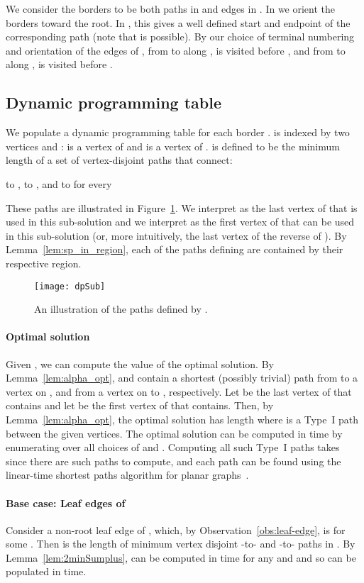 \documentclass[11pt,twoside]{article}
\begin{document}
We consider the borders to be both paths in  and edges in . In  we orient the borders toward the root.  In , this gives a well defined start  and endpoint  of the corresponding path  (note that  is possible).  By our choice of terminal numbering and orientation of the edges of , from  to  along ,  is visited before , and from  to  along ,  is visited before .

\subsection{Dynamic programming table}
We populate a dynamic programming table  for each border .   is indexed by two vertices  and :  is a vertex of   and  is a vertex of .   is defined to be the minimum length of a set of vertex-disjoint paths that connect:
  \begin{center}
     to ,  to , and  to  for every 
  \end{center}
These paths are illustrated in Figure~\ref{fig:dp-table}.
We interpret  as the last vertex of  that is used in this sub-solution and we interpret  as the first vertex of  that can be used in this sub-solution (or, more intuitively, the last vertex of the reverse of ).  By Lemma~\ref{lem:sp_in_region}, each of the paths defining  are contained by their respective region.
\begin{figure}[ht]
  \centering
    \texttt{[image: dpSub]}
  \caption{An illustration of the paths defined by .}
  \label{fig:dp-table}
\end{figure}

\paragraph{Optimal solution}  Given , we can compute the value of the optimal solution.  By Lemma~\ref{lem:alpha_opt},  and  contain a shortest (possibly trivial) path from  to a vertex  on , and from a vertex  on  to , respectively.  Let  be the last vertex of  that  contains and let  be the first vertex of  that  contains.  Then, by Lemma~\ref{lem:alpha_opt}, the optimal solution has length  where  is a Type~I path between the given vertices.  The optimal solution can be computed in  time by enumerating over all choices of  and .  Computing all such Type~I paths takes  since there are  such paths to compute, and each path can be found using the linear-time shortest paths algorithm for planar graphs~\cite{henzinger1997planarShortestPaths}.

\paragraph{Base case: Leaf edges of }  Consider a non-root leaf edge of , which, by Observation~\ref{obs:leaf-edge}, is  for some .  Then  is the length of minimum vertex disjoint -to- and -to- paths in .
By Lemma~\ref{lem:2minSumplus},  can be computed in  time  for any  and  and so  can be populated in  time. 
\end{document}
